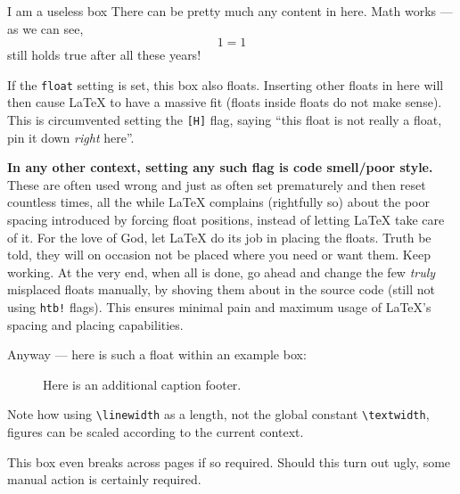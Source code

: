 \begin{example}[%
        label={ex:example},%
    ]{%
        I am a useless box%
    }
    There can be pretty much any content in here.
    Math works --- as we can see,
    \begin{equation}
        1 = 1
    \end{equation}
    still holds true after all these years!

    If the \verb|float| setting is set, this box also floats.
    Inserting other floats in here will then cause \LaTeX{} to have a massive fit
    (floats inside floats do not make sense).
    This is circumvented setting the \verb|[H]| flag,
    saying \enquote{this float is not really a float, pin it down \emph{right} here}.

    \textbf{In any other context, setting any such flag is code smell/poor style.}
    These are often used wrong and just as often set prematurely and then reset
    countless times, all the while \LaTeX{} complains (rightfully so) about the poor
    spacing introduced by forcing float positions, instead of letting \LaTeX{} take
    care of it.
    For the love of God, let \LaTeX{} do its job in placing the floats.
    Truth be told, they will on occasion not be placed where you need or want them.
    Keep working.
    At the very end, when all is done, go ahead and change the few \emph{truly}
    misplaced floats manually, by shoving them about in the source code
    (still not using \verb|htb!| flags).
    This ensures minimal pain and maximum usage of \LaTeX{}'s spacing and placing
    capabilities.

    Anyway --- here is such a float within an example box:
    \begin{figure}[tbp]

        \begin{minipage}[t]{0.62\linewidth}
            
        \end{minipage}
        \hfill
        \begin{minipage}[t]{0.32\linewidth}
            \raggedright
            \label{fig:inside_float}
            \caption*{Here is an additional caption footer.}
        \end{minipage}

    \end{figure}

    Note how using \verb|\linewidth| as a length, not the global constant
    \verb|\textwidth|, figures can be scaled according to the current context.

    This box even breaks across pages if so required.
    Should this turn out ugly, some manual action is certainly required.
\end{example}
